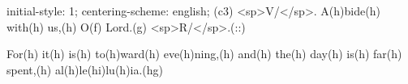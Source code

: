 initial-style: 1;
centering-scheme: english;
(c3) <sp>V/</sp>. A(h)bide(h) with(h) us,(h) O(f) Lord.(g) <sp>R/</sp>.(::)

For(h) it(h) is(h) to(h)ward(h) eve(h)ning,(h) and(h) the(h) day(h) is(h) far(h) spent,(h) al(h)le(hi)lu(h)ia.(hg)
